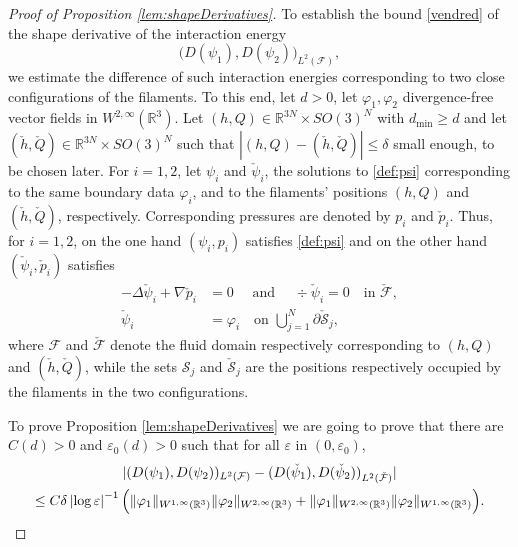 \documentclass[11pt]{article}
\providecommand{\widecheck}{\check}
\newcommand{\R}{\mathbb{R}}
\let\eps\varepsilon
\newcommand{\dmin}{d_{\min}}
\theoremstyle{definition}
\theoremstyle{remark}
\begin{document}
\begin{proof}[Proof of Proposition \ref{lem:shapeDerivatives}]
To establish the bound \eqref{vendred} of the shape derivative of the interaction energy
\[
\big(D (\psi_1),D (\psi_2)\big)_{L^2(\mathcal F)},\] we estimate the difference of such interaction energies
corresponding to two close configurations of the filaments.
To this end, let $d>0$, let $\varphi_1,\varphi_2 $ divergence-free vector fields in $W^{2,\infty}(\R^3)$. Let $(h,Q) \in \R^{3N} \times SO(3)^N$ with $\dmin \geq d$
and let $(\widecheck h,\widecheck Q) \in \R^{3N} \times SO(3)^N$ such that $|(h, Q) - (\widecheck h,\widecheck Q)| \leq \delta$ small enough, to be chosen later.
For $i = 1,2$, let $\psi_i$ and $ \widecheck \psi_i$, the solutions to \eqref{def:psi} corresponding to the same boundary data $\varphi_i$, and to the filaments' positions $(h, Q)$ and $(\widecheck h,\widecheck Q)$, respectively. Corresponding pressures are denoted by $p_i$ and $\widecheck p_i$.
Thus, for $i = 1,2$, on the one hand $(\psi_i,p_i)$ satisfies \eqref{def:psi}
and on the other hand $(\widecheck \psi_i,\widecheck p_i)$ satisfies
\begin{equation} \label{def:psi-bar}
\begin{aligned}
- \Delta \widecheck \psi_i + \nabla \widecheck p_i &= 0 \quad \text{ and } \quad \div \widecheck \psi_i = 0 \quad \text{in } \widecheck {\mathcal F}, \\
\widecheck \psi_i &= \varphi_i \quad \text{on } \bigcup_{j=1}^N \partial \widecheck {\mathcal S}_j,
\end{aligned}
\end{equation}
where $\mathcal F$ and $\widecheck {\mathcal F}$ denote the fluid domain respectively corresponding to $(h, Q)$ and $(\widecheck h, \widecheck Q)$, while the sets ${\mathcal S}_j$ and $\widecheck {\mathcal S}_j$ are the positions respectively occupied by the filaments in the two configurations.

To prove Proposition \ref{lem:shapeDerivatives}
we are going to prove that there are $C(d)>0$ and $\eps_0(d) >0$ such that for all $\eps$ in $(0, \eps_0)$,
\begin{multline} \label{est:psi_1.psi_2}
|(D(\psi_1),D(\psi_2))_{L^2(\mathcal F)} - (D(\widecheck \psi_1),D(\widecheck \psi_2))_{L^2(\widecheck{\mathcal F})}|
\\ \leq C\delta \left|\log \eps\right|^{-1}
\Bigl(\|\varphi_1\|_{W^{1,\infty} (\R^3) } \|\varphi_2\|_{W^{2,\infty} (\R^3)}
+
\|\varphi_1\|_{W^{2,\infty} (\R^3) } \|\varphi_2\|_{W^{1,\infty} (\R^3)}
\Bigr).
\end{multline}


\end{proof}
\end{document}
